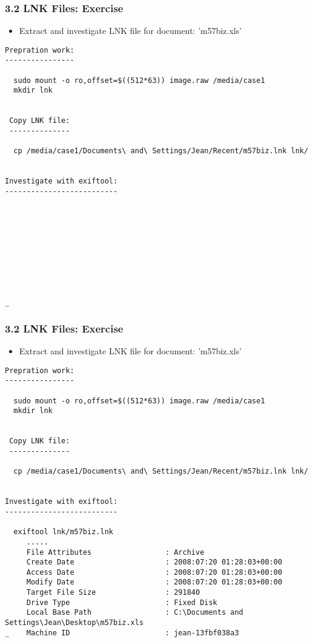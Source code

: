 \begin{frame}[fragile]
  \frametitle{3.2 LNK Files: Exercise}
    \begin{itemize}
	    \item[] Extract and investigate LNK file for document: 'm57biz.xls'
    \end{itemize}
  \begin{lstlisting}[basicstyle=\tiny]
Prepration work:
----------------

  sudo mount -o ro,offset=$((512*63)) image.raw /media/case1
  mkdir lnk


 Copy LNK file:
 --------------
  
  cp /media/case1/Documents\ and\ Settings/Jean/Recent/m57biz.lnk lnk/


Investigate with exiftool:
--------------------------










_ 
  \end{lstlisting}
\end{frame}


\begin{frame}[fragile]
  \frametitle{3.2 LNK Files: Exercise}
    \begin{itemize}
	    \item[] Extract and investigate LNK file for document: 'm57biz.xls'
    \end{itemize}
  \begin{lstlisting}[basicstyle=\tiny]
Prepration work:
----------------

  sudo mount -o ro,offset=$((512*63)) image.raw /media/case1
  mkdir lnk


 Copy LNK file:
 --------------
  
  cp /media/case1/Documents\ and\ Settings/Jean/Recent/m57biz.lnk lnk/


Investigate with exiftool:
--------------------------

  exiftool lnk/m57biz.lnk
     .....
     File Attributes                 : Archive
     Create Date                     : 2008:07:20 01:28:03+00:00
     Access Date                     : 2008:07:20 01:28:03+00:00
     Modify Date                     : 2008:07:20 01:28:03+00:00
     Target File Size                : 291840
     Drive Type                      : Fixed Disk
     Local Base Path                 : C:\Documents and Settings\Jean\Desktop\m57biz.xls
_    Machine ID                      : jean-13fbf038a3
  \end{lstlisting}
\end{frame}


